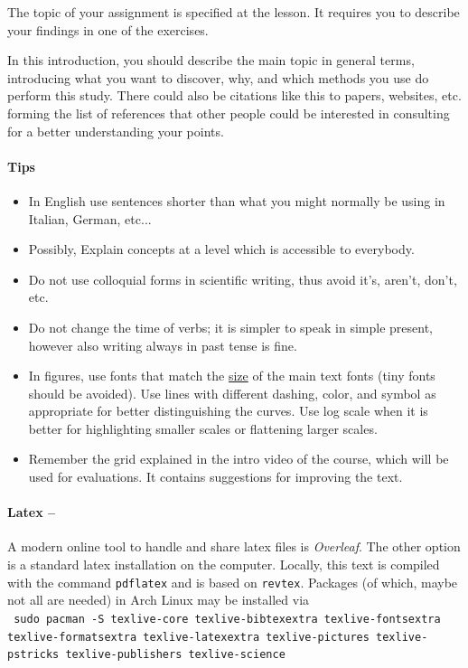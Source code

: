 \documentclass[prl,twocolumn]{revtex4-1}
\begin{document}
The topic of your assignment is specified at the lesson.
It requires you to describe your findings in one of the exercises.

In this introduction,
you should describe the main topic in general terms, introducing what you want to discover, why, and which
methods you use do perform this study.
There could also be citations like this \cite{pap1} to papers, websites, etc. forming the list of references that other people could be interested in consulting for a better understanding your points.

\paragraph{\bf Tips}
\begin{itemize}
\item In English use sentences shorter than what you might normally be using in Italian, German, etc...
\item Possibly, Explain concepts at a level which is accessible to everybody.
\item Do not use colloquial forms in scientific writing, thus avoid it's, aren't, don't, etc.
\item Do not change the time of verbs; it is simpler to speak in simple present, however also writing always in past tense is fine.
\item In figures, use fonts that match the \underline{size} of the main text fonts (tiny fonts should be avoided). Use lines with different dashing, color, and symbol as appropriate for better distinguishing the curves. Use log scale when it is better for highlighting smaller scales or flattening larger scales. 
\item Remember the grid explained in the intro video of the course, which will be used for evaluations. It contains suggestions for improving the text.
\end{itemize}




\paragraph{\bf Latex --}

A modern online tool to handle and share latex files is {\em Overleaf}. The other option is a standard latex installation on the computer.
Locally, this text is compiled with the command \texttt{pdflatex} and is based on \texttt{revtex}.
Packages (of which, maybe not all are needed) in Arch Linux may be installed via\\
\texttt{
  sudo pacman -S texlive-core texlive-bibtexextra texlive-fontsextra  texlive-formatsextra texlive-latexextra texlive-pictures texlive-pstricks texlive-publishers  texlive-science}
\end{document}
